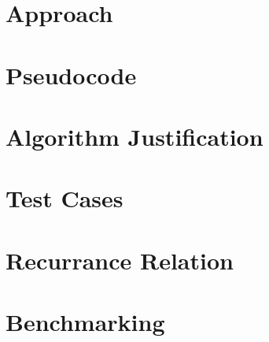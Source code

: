 \documentclass{labReport}
\begin{document}
\newpage
\begin{multicols*}{2}
\raggedcolumns



\section{Approach}

\section{Pseudocode}

\section{Algorithm Justification}



\section{Test Cases}

\section{Recurrance Relation}

\section{Benchmarking}

\end{multicols*}

\end{document}
